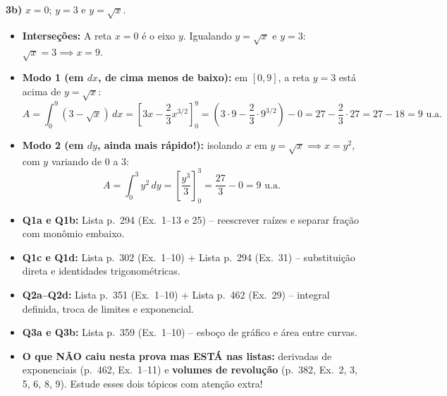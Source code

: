 \documentclass[10pt,a4paper]{article}
\begin{document}
\textbf{3b)} $x = 0$; \quad $y = 3$ \quad e \quad $y = \sqrt{x}$.
\begin{itemize}
    \item \textbf{Interseções:} A reta $x=0$ é o eixo $y$. Igualando $y = \sqrt{x}$ e $y = 3$: $\sqrt{x} = 3 \implies x = 9$.
    \item \textbf{Modo 1 (em $dx$, de cima menos de baixo):} em $[0,9]$, a reta $y=3$ está acima de $y=\sqrt{x}$:
          \[
              A = \int_{0}^{9} (3 - \sqrt{x})\,dx = \left[3x - \frac{2}{3}x^{3/2}\right]_{0}^{9} = \left(3\cdot 9 - \frac{2}{3}\cdot 9^{3/2}\right) - 0 = 27 - \frac{2}{3}\cdot 27 = 27 - 18 = \boxed{9 \text{ u.a.}}
          \]
    \item \textbf{Modo 2 (em $dy$, ainda mais rápido!):} isolando $x$ em $y=\sqrt{x} \implies x = y^2$, com $y$ variando de $0$ a $3$:
          \[
              A = \int_{0}^{3} y^2\,dy = \left[\frac{y^3}{3}\right]_{0}^{3} = \frac{27}{3} - 0 = \boxed{9 \text{ u.a.}}
          \]
\end{itemize}

\begin{center}
\end{center}

\begin{dica}
    \begin{itemize}
        \item \textbf{Q1a e Q1b:} Lista p.\ 294 (Ex.\ 1--13 e 25) -- reescrever raízes e separar fração com monômio embaixo.
        \item \textbf{Q1c e Q1d:} Lista p.\ 302 (Ex.\ 1--10) + Lista p.\ 294 (Ex.\ 31) -- substituição direta e identidades trigonométricas.
        \item \textbf{Q2a--Q2d:} Lista p.\ 351 (Ex.\ 1--10) + Lista p.\ 462 (Ex.\ 29) -- integral definida, troca de limites e exponencial.
        \item \textbf{Q3a e Q3b:} Lista p.\ 359 (Ex.\ 1--10) -- esboço de gráfico e área entre curvas.
        \item \textbf{O que NÃO caiu nesta prova mas ESTÁ nas listas:} derivadas de exponenciais (p.\ 462, Ex.\ 1--11) e \textbf{volumes de revolução} (p.\ 382, Ex.\ 2, 3, 5, 6, 8, 9). Estude esses dois tópicos com atenção extra!
    \end{itemize}
\end{dica}
\fi
\end{document}
